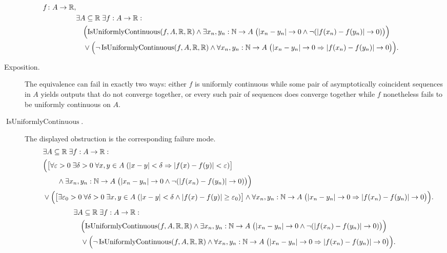 \begin{remark*}
\[
\begin{aligned}
  f\colon A\to\mathbb{R},\\
&\exists A \subseteq \mathbb{R}\;\exists f:A \to \mathbb{R}:\\
&\quad \Bigl(\operatorname{IsUniformlyContinuous}(f,A,\mathbb R,\mathbb R) \land \exists x_n,y_n:\mathbb{N}\to A\;
\bigl(|x_n - y_n| \to 0 \land \neg(|f(x_n) - f(y_n)| \to 0)\bigr)\Bigr)\\
&\quad \lor \Bigl(\neg \operatorname{IsUniformlyContinuous}(f,A,\mathbb R,\mathbb R) \land
\forall x_n,y_n:\mathbb{N}\to A\;
\bigl(|x_n - y_n| \to 0 \Rightarrow |f(x_n) - f(y_n)| \to 0\bigr)\Bigr).
\end{aligned}
\]
\end{remark*}

\begin{remark*}
\begin{description}
  \item[Exposition.]
The equivalence can fail in exactly two ways: either $f$ is uniformly continuous while some pair of asymptotically coincident sequences in $A$ yields outputs that do not converge together, or every such pair of sequences does converge together while $f$ nonetheless fails to be uniformly continuous on $A$.


  \item[\(\operatorname{IsUniformlyContinuous}.\)]
  The displayed obstruction is the corresponding failure mode.
  \[
\begin{aligned}
&\exists A \subseteq \mathbb{R}\;\exists f:A \to \mathbb{R}:\\
\quad &\Bigl(
\bigl[\forall \varepsilon>0\;\exists \delta>0\;\forall x,y\in A\;
(|x-y|<\delta\Rightarrow |f(x)-f(y)|<\varepsilon)\bigr]\\
&\qquad\land \exists x_n,y_n:\mathbb{N}\to A\;
\bigl(|x_n - y_n| \to 0 \land \neg(|f(x_n) - f(y_n)| \to 0)\bigr)\Bigr)\\
\quad &\lor \Bigl(
\bigl[\exists \varepsilon_0>0\;\forall \delta>0\;\exists x,y\in A\;
(|x-y|<\delta\land |f(x)-f(y)|\ge\varepsilon_0)\bigr]\land
\forall x_n,y_n:\mathbb{N}\to A\;
\bigl(|x_n - y_n| \to 0 \Rightarrow |f(x_n) - f(y_n)| \to 0\bigr)\Bigr).
\end{aligned}
  \]
  \[
\begin{aligned}
&\exists A \subseteq \mathbb{R}\;\exists f:A \to \mathbb{R}:\\
&\quad \Bigl(\operatorname{IsUniformlyContinuous}(f,A,\mathbb R,\mathbb R) \land \exists x_n,y_n:\mathbb{N}\to A\;
\bigl(|x_n - y_n| \to 0 \land \neg(|f(x_n) - f(y_n)| \to 0)\bigr)\Bigr)\\
&\quad \lor \Bigl(\neg \operatorname{IsUniformlyContinuous}(f,A,\mathbb R,\mathbb R) \land
\forall x_n,y_n:\mathbb{N}\to A\;
\bigl(|x_n - y_n| \to 0 \Rightarrow |f(x_n) - f(y_n)| \to 0\bigr)\Bigr).
\end{aligned}
  \]
\end{description}
\end{remark*}

